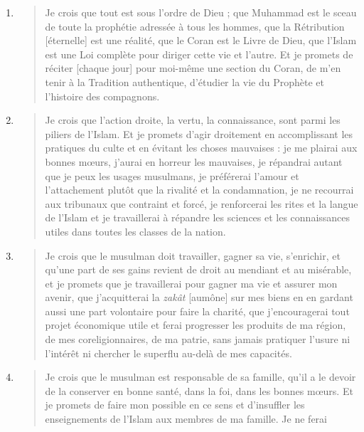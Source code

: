 \begin{enumerate}
\def\labelenumi{\arabic{enumi}.}
\item
  \begin{quote}
  Je crois que tout est sous l'ordre de Dieu ; que Muhammad est le sceau
  de toute la prophétie adressée à tous les hommes, que la Rétribution
  {[}éternelle{]} est une réalité, que le Coran est le Livre de Dieu,
  que l'Islam est une Loi complète pour diriger cette vie et l'autre. Et
  je promets de réciter {[}chaque jour{]} pour moi-même une section du
  Coran, de m'en tenir à la Tradition authentique, d'étudier la vie du
  Prophète et l'histoire des compagnons.
  \end{quote}
\item
  \begin{quote}
  Je crois que l'action droite, la vertu, la connaissance, sont parmi
  les piliers de l'Islam. Et je promets d'agir droitement en
  accomplissant les pratiques du culte et en évitant les choses
  mauvaises : je me plairai aux bonnes mœurs, j'aurai en horreur les
  mauvaises, je répandrai autant que je peux les usages musulmans, je
  préférerai l'amour et l'attachement plutôt que la rivalité et la
  condamnation, je ne recourrai aux tribunaux que contraint et forcé, je
  renforcerai les rites et la langue de l'Islam et je travaillerai à
  répandre les sciences et les connaissances utiles dans toutes les
  classes de la nation.
  \end{quote}
\item
  \begin{quote}
  Je crois que le musulman doit travailler, gagner sa vie, s'enrichir,
  et qu'une part de ses gains revient de droit au mendiant et au
  misérable, et je promets que je travaillerai pour gagner ma vie et
  assurer mon avenir, que j'acquitterai la \emph{zakât} {[}aumône{]} sur
  mes biens en en gardant aussi une part volontaire pour faire la
  charité, que j'encouragerai tout projet économique utile et ferai
  progresser les produits de ma région, de mes coreligionnaires, de ma
  patrie, sans jamais pratiquer l'usure ni l'intérêt ni chercher le
  superflu au-delà de mes capacités.
  \end{quote}
\item
  \begin{quote}
  Je crois que le musulman est responsable de sa famille, qu'il a le
  devoir de la conserver en bonne santé, dans la foi, dans les bonnes
  mœurs. Et je promets de faire mon possible en ce sens et d'insuffler
  les enseignements de l'Islam aux membres de ma famille. Je ne ferai

\end{quote}
\end{enumerate}
